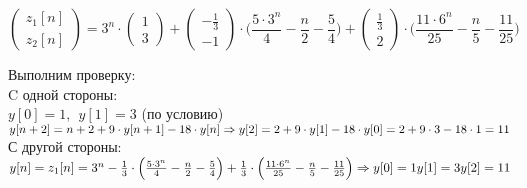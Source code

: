 \begin{displaymath}
\begin{pmatrix}
z_1[n]
\\
z_2[n]
\end{pmatrix} = 3^n \cdot \begin{pmatrix}
1
\\
3
\end{pmatrix} + \begin{pmatrix}
- \frac{1}{3}
\\
- 1
\end{pmatrix} \cdot \Big ( \frac{5 \cdot 3^n}{4} - \frac{n}{2} - \frac{5}{4} \Big ) + \begin{pmatrix}
\frac{1}{3}
\\
2
\end{pmatrix} \cdot \Big ( \frac{11 \cdot 6^n}{25} - \frac{n}{5} - \frac{11}{25} \Big )
\end{displaymath}

Выполним проверку:\\[1mm]

C одной стороны:\\[1mm]
$y[0] = 1, \ \ y[1] = 3$ (по условию) \\[1mm]
$y[n+2] = n + 2 + 9 \cdot y[n+1] - 18 \cdot y[n] \Rightarrow \\[1mm] y[2] = 2 + 9 \cdot y[1] - 18 \cdot y[0] = 2 + 9 \cdot 3 - 18 \cdot 1 = 11$\\[1mm]

С другой стороны:\\[1mm]
$y[n] = z_1[n] = 3^n -\frac{1}{3} \cdot \Big ( \frac{5 \cdot 3^n}{4} - \frac{n}{2} - \frac{5}{4} \Big ) + \frac{1}{3} \cdot \Big ( \frac{11 \cdot 6^n}{25} - \frac{n}{5} - \frac{11}{25} \Big ) \Rightarrow \\[1mm]
y[0] = 1\\[1mm]
y[1] = 3\\[1mm]
y[2] = 11$


